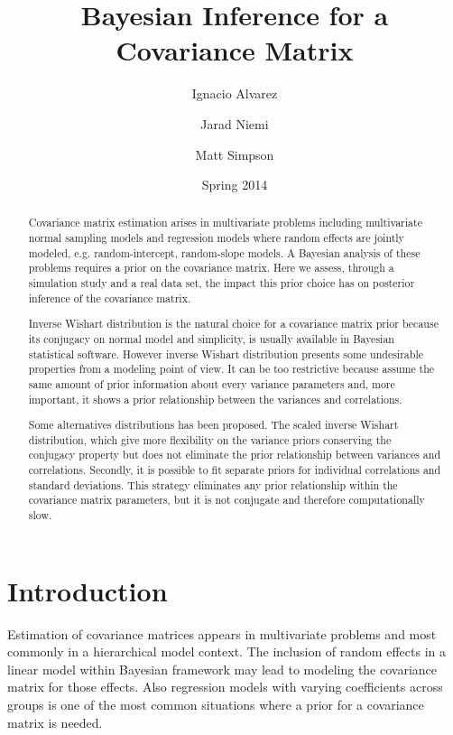 \documentclass[a4paper]{article}
\title{Bayesian Inference for a Covariance Matrix}
\author{Ignacio Alvarez \and Jarad Niemi \and Matt Simpson  \nacho{Is the names order right?} }
\date{ Spring 2014 }
\begin{document}
 
\maketitle 


\begin{abstract}
Covariance matrix estimation arises in multivariate problems including multivariate normal sampling models and regression models where random effects are jointly modeled, e.g. random-intercept, random-slope models. A Bayesian analysis of these problems requires a prior on the covariance matrix. Here we assess, through a simulation study and a real data set, the impact this prior choice has on posterior inference of the covariance matrix.

Inverse Wishart distribution is the natural choice for a covariance matrix prior because its conjugacy on normal model and simplicity, is usually available in Bayesian statistical software. However inverse Wishart distribution presents some undesirable properties from a modeling point of view. It can be too restrictive because assume the same amount of prior information about every variance parameters and, more important, it shows a prior relationship between the variances and correlations.

Some alternatives distributions has been proposed. The scaled inverse Wishart distribution, which give more flexibility on the variance priors conserving the conjugacy property but does not eliminate the prior relationship between variances and correlations. Secondly, it is possible to fit separate priors for individual correlations and standard deviations. This strategy eliminates any prior relationship within the covariance matrix parameters, but it is not conjugate and therefore computationally slow. 
\end{abstract}


\newpage 

{} 

\section{Introduction} 

Estimation of covariance matrices appears in multivariate problems and most commonly in a hierarchical model context. The inclusion of random effects in a linear model within Bayesian framework may lead to modeling the covariance matrix for those effects. Also regression models with varying coefficients across groups is one of the most common situations where a prior for a covariance matrix is needed. 
\end{document}
